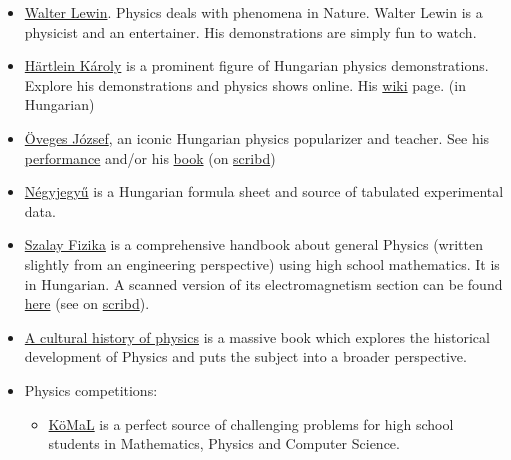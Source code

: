 \documentclass{article}
\begin{document}
\begin{itemize}
\item \href{https://www.youtube.com/channel/UCiEHVhv0SBMpP75JbzJShqw}{Walter Lewin}. Physics deals with phenomena in Nature. Walter Lewin is a physicist and an entertainer. His demonstrations are simply fun to watch. 

\item \href{http://goliat.eik.bme.hu/~hartlein/}{Härtlein Károly} is a prominent figure of Hungarian physics demonstrations. Explore his demonstrations and physics shows online. His \href{https://hu.wikipedia.org/wiki/H\%C3\%A4rtlein_K\%C3\%A1roly}{wiki} page. (in Hungarian)

\item \href{https://hu.wikipedia.org/wiki/\%C3\%96veges_J\%C3\%B3zsef}{Öveges József}, an iconic Hungarian physics popularizer and teacher. See his \href{https://videa.hu/videok/tudomany-technika/oveges-professzor-legkedvesebb-kiserleteim-1-fizika-Od5Qi64hETkOe6hM}{performance} and/or his \href{https://moly.hu/konyvek/oveges-jozsef-kiserletek-konyve}{book} (on \href{https://www.scribd.com/doc/238251897/Oveges-Jozsef-Kiserletek-Konyve}{scribd})

\item \href{https://ppeter.apaczai.elte.hu/erettsegi/Negyjegyu_fuggvenytablazat.pdf}{Négyjegyű} is a Hungarian formula sheet and source of tabulated experimental data.

\item \href{https://en.mandadb.hu/tetel/357528/Fizika}{Szalay Fizika} is a comprehensive handbook about general Physics (written slightly from an engineering perspective) using high school mathematics. It is in Hungarian. A scanned version of its electromagnetism section can be found \href{https://web.archive.org/web/20200317111146/http://users.atw.hu/gepesz-lev/4felev/fizika.pdf}{here} (see on \href{https://www.scribd.com/document/492897465/Szalay-Fizika}{scribd}).

\item \href{https://www.goodreads.com/book/show/13335561-a-cultural-history-of-physics}{A cultural history of physics} is a massive book which explores the historical development of Physics and puts the subject into a broader perspective.

\item Physics competitions:
\begin{itemize}
\item \href{https://www.komal.hu/home.e.shtml}{KöMaL} is a perfect source of challenging problems for high school students in Mathematics, Physics and Computer Science.


\end{itemize}
\end{itemize}
\end{document}
